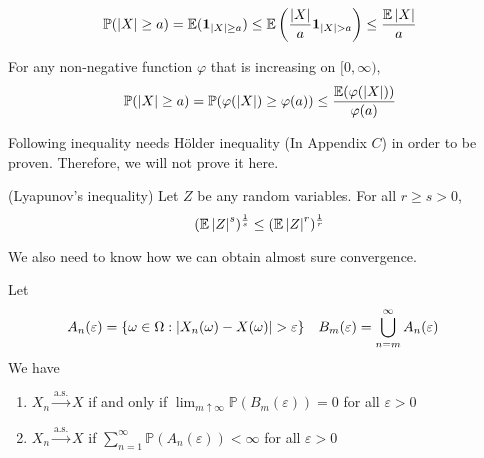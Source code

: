 \documentclass{huhtakm-template-book}
\newcommand{\prob}{\mathbb{P}}
\newcommand{\expect}{\mathbb{E}}
\begin{document}
\begin{proofing}
    \begin{equation*}
        \prob(\abs{X}\geq a)=\expect(\mathbf{1}_{\abs{X}\geq a})\leq\expect\left(\frac{\abs{X}}{a}\mathbf{1}_{\abs{X}>a}\right)\leq\frac{\expect\abs{X}}{a}
    \end{equation*}
\end{proofing}
\begin{rem}
    For any non-negative function $\varphi$ that is increasing on $[0,\infty)$,
    \begin{equation*}
        \prob(\abs{X}\geq a)=\prob(\varphi(\abs{X})\geq\varphi(a))\leq\frac{\expect(\varphi(\abs{X}))}{\varphi(a)}
    \end{equation*}
\end{rem}
Following inequality needs H\"older inequality (In Appendix $C$) in order to be proven. Therefore, we will not prove it here.
\begin{lem}(Lyapunov's inequality)
    Let $Z$ be any random variables. For all $r\geq s>0$,
    \begin{equation*}
        (\expect\abs{Z}^{s})^{\frac{1}{s}}\leq(\expect\abs{Z}^{r})^{\frac{1}{r}}
    \end{equation*}
\end{lem}
We also need to know how we can obtain almost sure convergence.
\begin{lem}
    \label{Chapter 7 Lemma Obtaining almost sure convergence}
    Let
    \begin{align*}
        A_{n}(\varepsilon)&=\{\omega\in\Omega:\abs{X_{n}(\omega)-X(\omega)}>\varepsilon\} & B_{m}(\varepsilon)&=\bigcup_{n=m}^{\infty}A_{n}(\varepsilon)
    \end{align*}
    We have
    \begin{enumerate}
        \item $X_{n}\xrightarrow{\text{a.s.}}X$ if and only if $\lim_{m\uparrow\infty}\prob(B_{m}(\varepsilon))=0$ for all $\varepsilon>0$
        \item $X_{n}\xrightarrow{\text{a.s.}}X$ if $\sum_{n=1}^{\infty}\prob(A_{n}(\varepsilon))<\infty$ for all $\varepsilon>0$
    \end{enumerate}
\end{lem}
\end{document}
